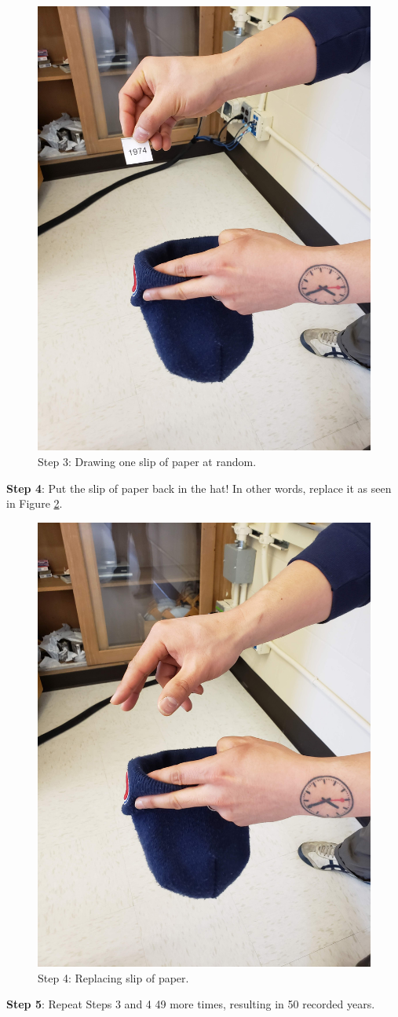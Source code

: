 \documentclass[
]{book}
\begin{document}
\begin{figure}
\includegraphics[width=0.5\linewidth]{images/sampling/pennies/tactile_simulation/3_draw_at_random} \caption{Step 3: Drawing one slip of paper at random.}\label{fig:tactile-resampling-3}
\end{figure}

\textbf{Step 4}: Put the slip of paper back in the hat! In other words, replace it as seen in Figure \ref{fig:tactile-resampling-4}.

\begin{figure}
\includegraphics[width=0.5\linewidth]{images/sampling/pennies/tactile_simulation/4_put_it_back} \caption{Step 4: Replacing slip of paper.}\label{fig:tactile-resampling-4}
\end{figure}

\textbf{Step 5}: Repeat Steps 3 and 4 49 more times, resulting in 50 recorded years.
\end{document}
